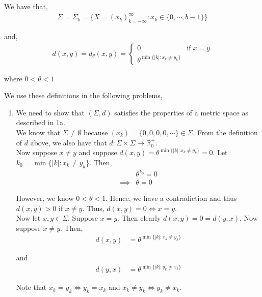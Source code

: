 \documentclass[12pt]{article}
\begin{document}
We have that,
\begin{align*}
\Sigma = \Sigma_b = \{X = (x_k)_{k = -\infty}^{\infty}: x_k \in \{0, \cdots, b - 1\}\}
\end{align*}

and,
\begin{align*}
d(x,y) = d_{\theta}(x,y) = \begin{cases*}
      0 & \text{if} \; x = y \\
      \theta^{\min\{|k|: x_k \neq y_k\}} &
    \end{cases*}
\end{align*}

where $0 < \theta < 1$

\newpage
We use these definitions in the following problems,
\begin{enumerate}[label=(\alph*)]
\item We need to show that $(\Sigma, d)$ satisfies the properties of a metric space as described in 1a.\\

We know that $\Sigma \neq \emptyset$ because $(x_k) = \{0, 0, 0, 0, \cdots \} \in \Sigma$. From the definition of $d$ above, we also have that $d: \Sigma \times \Sigma \to \mathbb{R}^+_0$.\\

Now suppose $x \neq y$ and suppose $d(x, y) = \theta^{\min\{|k|: x_k \neq y_k\}} = 0$. Let $k_0 = \min\{|k|: x_k \neq y_k\}$. Then,
\begin{align*}
&\theta^{k_0} = 0\\
\implies &\theta = 0
\end{align*}

However, we know $0 < \theta < 1$. Hence, we have a contradiction and thus $d(x,y) > 0$ if $x \neq y$. Thus, $d(x, y) = 0 \iff x = y$.\\

Now let $x, y \in \Sigma$. Suppose $x = y$. Then clearly $d(x, y) = 0 = d(y, x)$. Now suppose $x \neq y$. Then,
\begin{align*}
d(x, y) &= \theta^{\min\{|k|: x_k \neq y_k\}}
\end{align*}

and 
\begin{align*}
d(y, x) &= \theta^{\min\{|k|: y_k \neq x_k\}}
\end{align*}

Note that $x_k = y_k \iff y_k = x_k$ and $x_k \neq y_k \iff y_k \neq x_k$.\\


\end{enumerate}
\end{document}
